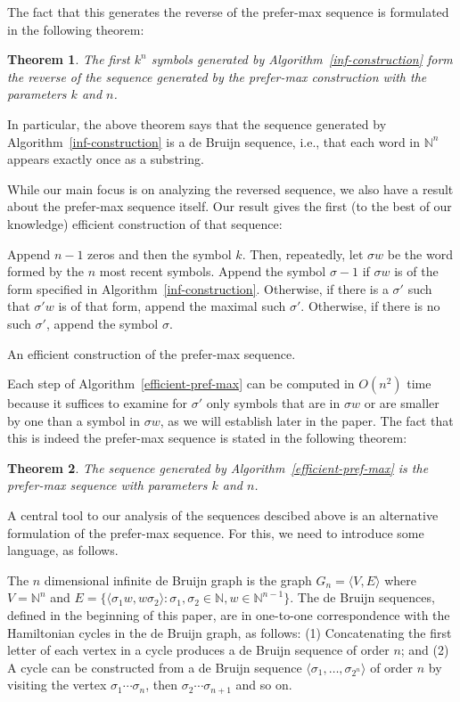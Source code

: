 \documentclass{article}
\newtheorem{theorem}{Theorem}
\theoremstyle{definition}
\newcommand{\N}{{\mathbb{N}}}
\newcommand{\T}[1]{\langle{#1}\rangle}
\begin{document}
The fact that this generates the reverse of the prefer-max sequence is formulated in the following theorem:
 
\begin{theorem} 
The first $k^n$ symbols generated by Algorithm~\ref{inf-construction} form the reverse of the sequence generated by the prefer-max construction with the parameters $k$ and $n$.	
\end{theorem} 

In particular, the above theorem says that the sequence generated by Algorithm~\ref{inf-construction} is a de Bruijn sequence, i.e., that each word in $\N^n$ appears exactly once as a substring.

While our main focus is on analyzing the reversed sequence, we also have a result about the prefer-max sequence itself. Our result gives the first (to the best of our knowledge) efficient construction of that sequence:

\begin{algorithm}
	Append $n-1$ zeros and then the symbol $k$. Then, repeatedly, let $\sigma w$ be the word formed by the $n$ most recent symbols. Append the symbol $\sigma-1$  if $\sigma w$  is of the form specified in Algorithm~\ref{inf-construction}. Otherwise, if there is a  $\sigma'$ such that $\sigma'w$ is of that form, append the maximal such $\sigma'$. Otherwise, if there is no such $\sigma'$, append the symbol $\sigma$.
		
	\caption{An efficient construction of the prefer-max sequence.}
	\label{efficient-pref-max}
\end{algorithm}

Each step of Algorithm~\ref{efficient-pref-max} can be computed in $O(n^2)$ time because it suffices to examine for $\sigma'$ only symbols that are in $\sigma w$ or are smaller by one than a symbol in $\sigma w$, as we will establish later in the paper.
The fact that this is indeed the prefer-max sequence is stated in the following theorem:

\begin{theorem}
	The sequence generated by Algorithm~\ref{efficient-pref-max} is the prefer-max sequence with parameters $k$ and $n$.
\end{theorem}
	

A central tool to our analysis of the sequences descibed above is an alternative formulation of the prefer-max sequence. For this, we need to introduce some language, as follows.

The $n$ dimensional infinite de Bruijn graph is the graph $G_{n}=\T{V,E}$ where $V=\N^n$ and $E=\{ \T{\sigma_1 w, w \sigma_2} \colon \sigma_1,\sigma_2\in\N, w \in \N^{n-1}\}$. The de Bruijn sequences, defined in the beginning of this paper, are in one-to-one correspondence with the Hamiltonian cycles in the de Bruijn graph, as follows: (1) Concatenating the first letter of each vertex in a cycle produces a de Bruijn sequence of order $n$; and (2) A cycle can be constructed from a de Bruijn sequence $\T{\sigma_1,\dots,\sigma_{2^n}}$ of order $n$ by visiting the vertex $\sigma_1\cdots\sigma_n$, then $\sigma_2\cdots\sigma_{n+1}$ and so on.
\end{document}

